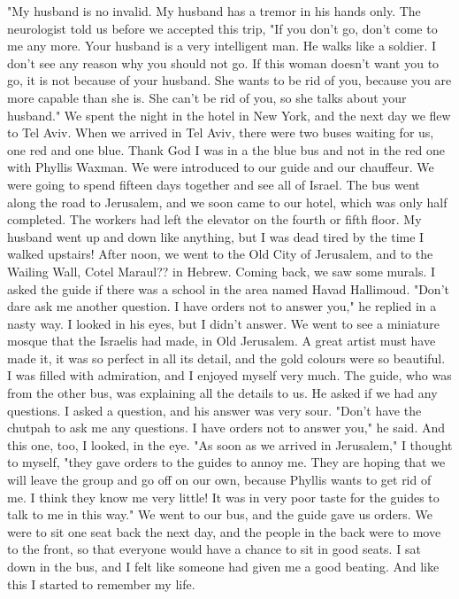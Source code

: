 "My husband is no invalid.
My husband has a tremor in his hands only.
The neurologist told us before we accepted this trip, "If you don't go, don't come to me any more.
Your husband is a very intelligent man.
He walks like a soldier.
I don't see any reason why you should not go.
If this woman doesn't want you to go, it is not because of your husband.
She wants to be rid of you, because you are more capable than she is.
She can't be rid of you, so she talks about your husband."
We spent the night in the hotel in New York, and the next day we flew to Tel Aviv.
When we arrived in Tel Aviv, there were two buses waiting for us, one red and one blue.
Thank God I was in a the blue bus and not in the red one with Phyllis Waxman.
We were introduced to our guide and our chauffeur.
We were  going to spend fifteen days together and see all of Israel.
The bus went along the road to Jerusalem, and we soon came to our hotel, which was only half completed.
The workers had left the elevator on the fourth or fifth floor.
My husband went up and down like anything, but I was dead tired by the time I walked upstairs!
After noon, we went to the Old City of Jerusalem, and to the Wailing Wall, Cotel Maraul??
in Hebrew.
Coming back, we saw some murals.
I asked the guide if there was a school in the area named Havad Hallimoud.
"Don't dare ask me another question.
I have orders not to answer you," he replied in a nasty way.
I looked in his eyes, but I didn't answer.
We went to see a miniature mosque that the Israelis had made, in Old Jerusalem.
A great artist must have made it, it was so perfect in all its detail, and the gold colours were so beautiful.
I was filled with admiration, and I enjoyed myself very much.
The guide, who was from the other bus, was explaining all the details to us.
He asked if we had any questions.
I asked a question, and his  answer was very sour.
"Don't have the chutpah to ask me any questions.
I have orders not to answer you," he said.
And this one, too, I looked, in the eye.
"As soon as we arrived in Jerusalem," I thought to myself, "they gave orders to the guides to annoy me.
They are hoping that we will leave the group and go off on our own, because Phyllis wants to get rid of me.
I think they know me very little!
It was  in very poor taste for the guides to talk to me in this way."
We went to our bus, and the guide gave us orders.
We were to sit one seat back the next day, and the people in the back were to move to the front, so that everyone would have a chance to sit in good seats.
I sat down in the bus, and I felt like someone had given me a good beating.
And like this I started to remember my life.

